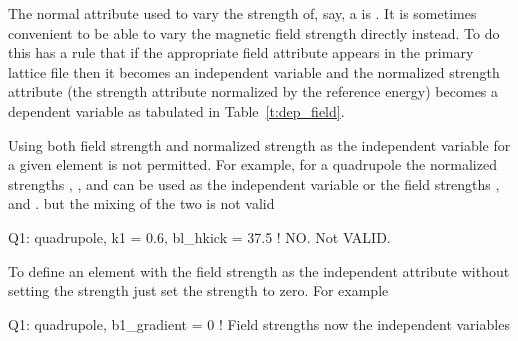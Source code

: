 The normal attribute used to vary the strength of, say, a
 is .  It is sometimes convenient to be able to
vary the magnetic field strength directly instead. To do this \bmad
has a rule that if the appropriate field attribute appears in the
primary lattice file then it becomes an independent variable and the
normalized strength attribute (the strength attribute normalized by
the reference energy) becomes a dependent variable as tabulated in
Table~\ref{t:dep_field}.
\begin{table}[ht]
\caption {Field and Strength Attributes.}
\label{t:dep_field}
\end{table}
Using both field strength and normalized strength as the independent
variable for a given element is not permitted. For example, for a quadrupole the 
normalized strengths , , and  can be used as the
independent variable or the field strengths ,  and
. but the mixing of the two is not valid
\begin{example}
  Q1: quadrupole, k1 = 0.6, bl_hkick = 37.5  ! NO. Not VALID.
\end{example}
To define an element with the field strength as the independent
attribute without setting the strength just set the strength to zero. For example
\begin{example}
  Q1: quadrupole, b1_gradient = 0   ! Field strengths now the independent variables
\end{example}


